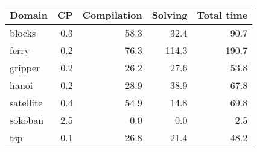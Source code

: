 \begin{tabular}{l|rrr|r}
	\toprule
	Domain & CP & Compilation & Solving & Total time \\ 
	\midrule 
	blocks & 0.3 & 58.3 & 32.4 & 90.7 \\ 
	ferry & 0.2 & 76.3 & 114.3 & 190.7 \\ 
	gripper & 0.2 & 26.2 & 27.6 & 53.8 \\ 
	hanoi & 0.2 & 28.9 & 38.9 & 67.8 \\ 
	satellite & 0.4 & 54.9 & 14.8 & 69.8 \\ 
	sokoban & 2.5 & 0.0 & 0.0 & 2.5 \\ 
	tsp & 0.1 & 26.8 & 21.4 & 48.2 \\ 
	\bottomrule
\end{tabular}
